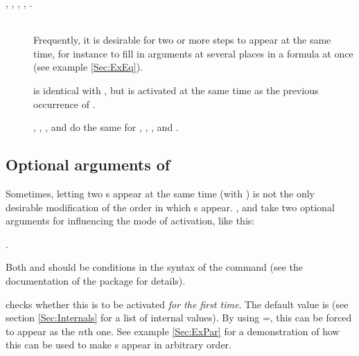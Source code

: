 \begin{slide}
\begin{description}
  \item[\small%
    ,
    ,
    ,
    ,
    .]\mbox{}\\
    Frequently, it is desirable for two or more steps to appear at the same
    time, for instance to fill in arguments at
    several places in a formula at once (see example \ref{Sec:ExEq}).

     is identical with , but is
    activated at the same time as the previous occurrence of .

    , , , and
     do the same for , , , and
    .
  \end{description}

  \newslide

  \subsection{Optional arguments of }%
  Sometimes, letting two s appear at the same time (with ) is not the only desirable
  modification of the order in which s appear. ,  and
   take two optional arguments for influencing the mode of activation, like this:
  \begin{center}
    .
  \end{center}
  Both  and  should be conditions in the syntax of the 
  command (see the documentation of the
  \href{ftp://ftp.dante.de/tex-archive/help/Catalogue/entries/ifthen.html}{} package for details).

  \newslide

   checks whether this  is to be activated \emph{for the first time}. The
  default value is  (see section \ref{Sec:Internals}
  for a list of internal values). By using =, this  can be forced to
  appear as the $n$th one. See example \ref{Sec:ExPar} for a demonstration of how this can be used to make
  s appear in arbitrary order.


\end{slide}
